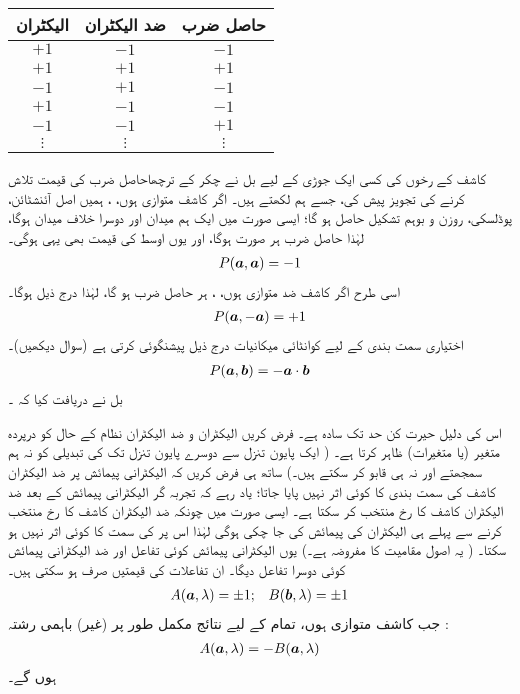 \begin{center}
\begin{tabular}{c c c}
\toprule
الیکٹران & ضد الیکٹران &حاصل  ضرب \\
\midrule
$+1$ & $-1$ & $-1$ \\
$+1$ & $+1$ & $+1$ \\
$-1$ & $+1$ & $-1$ \\
$+1$ & $-1$ & $-1$ \\
$-1$ & $-1$ & $+1$ \\
$\vdots$ & $\vdots$ & $\vdots$ \\
\bottomrule
\end{tabular}
\end{center}

کاشف کے رخوں کی کسی ایک جوڑی کے لیے بل نے چکر کے  ترچھا{حاصل ضرب}  کی   قیمت تلاش  کرنے کی تجویز پیش کی،  جسے ہم  لکھتے ہیں۔ اگر کاشف متوازی ہوں،  ،  ہمیں   اصل آئنشٹائن،    پوڈلسکی،  روزن و  بوہم تشکیل  حاصل ہو گا؛  ایسی صورت میں ایک ہم میدان اور دوسرا خلاف میدان ہوگا،  لہٰذا  حاصل ضرب ہر صورت  ہوگا،  اور یوں اوسط کی قیمت بھی یہی ہوگی۔
\begin{align}
	P({{\boldsymbol{a}}},{{\boldsymbol{a}}}) = -1
\end{align}
اسی طرح اگر کاشف ضد متوازی ہوں، ،  ہر حاصل ضرب  ہو گا، لہٰذا درج ذیل ہوگا۔
\begin{align}
	P({{\boldsymbol{a}}}, -{{\boldsymbol{a}}}) = +1
\end{align}
اختیاری سمت بندی کے لیے کوانٹائی  میکانیات درج ذیل پیشنگوئی  کرتی ہے (سوال   دیکھیں)۔
\begin{align}
	P({{\boldsymbol{a}}}, {{\boldsymbol{b}}}) = -{{\boldsymbol{a}}}\cdot {\ensuremath{{\boldsymbol{b}}}}
\end{align}
 بل نے دریافت کیا کہ ۔

اس کی دلیل حیرت کن حد تک سادہ ہے۔ فرض کریں الیکٹران و  ضد الیکٹران نظام کے  حال کو  درپردہ متغیر (یا متغیرات)    ظاہر کرتا ہے۔ ( ایک پایون تنزل سے دوسرے پایون تنزل تک  کی تبدیلی کو نہ ہم سمجھتے اور نہ ہی قابو کر سکتے ہیں۔)  ساتھ ہی فرض کریں  کہ الیکٹرانی  پیمائش پر ضد الیکٹران کاشف کی سمت بندی  کا کوئی اثر نہیں پایا جاتا؛  یاد رہے کہ تجربہ گر  الیکٹرانی پیمائش کے بعد ضد الیکٹران کاشف کا رخ منتخب کر سکتا ہے۔ ایسی صورت میں چونکہ ضد الیکٹران کاشف کا رخ منتخب کرنے سے پہلے ہی الیکٹران کی پیمائش کی جا چکی ہوگی لہٰذا اس پر   کی  سمت کا کوئی اثر نہیں ہو سکتا۔ ( یہ اصول مقامیت کا مفروضہ ہے۔)  یوں الیکٹرانی پیمائش کوئی تفاعل  اور ضد الیکٹرانی پیمائش کوئی  دوسرا تفاعل  دیگا۔ ان تفاعلات کی قیمتیں صرف  ہو سکتی ہیں۔
\begin{align}
	A({{\boldsymbol{a}}}, \lambda) = \pm1; && B({{\boldsymbol{b}}}, \lambda) = \pm 1
\end{align}
جب کاشف متوازی ہوں، تمام  کے لیے  نتائج مکمل طور پر (غیر)  باہمی رشتہ :
\begin{align}\label{مساوات_پس_غیر_باہمی_رشتہ}
	A({{\boldsymbol{a}}}, \lambda) = -B({{\boldsymbol{a}}}, \lambda)
\end{align}
ہوں گے۔

